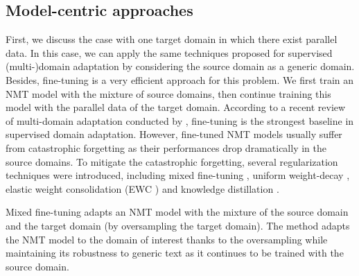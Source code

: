 \subsection{Model-centric approaches}
First, we discuss the case with one target domain in which there exist parallel data. In this case, we can apply the same techniques proposed for supervised (multi-)domain adaptation by considering the source domain as a generic domain. Besides, fine-tuning is a very efficient approach for this problem\citep{Luong15stanford,Servan16Domain,Freitag16fast,Miceli17regularization}. We first train an NMT model with the mixture of source domains, then continue training this model with the parallel data of the target domain. According to a recent review of multi-domain adaptation conducted by \citet{Pham21revisiting}, fine-tuning is the strongest baseline in supervised domain adaptation. However, fine-tuned NMT models usually suffer from catastrophic forgetting \citep{Michael89catastrophic} as their performances drop dramatically in the source domains. To mitigate the catastrophic forgetting, several regularization techniques were introduced, including mixed fine-tuning \citep{Chu17empirical}, uniform weight-decay \citep{Miceli17regularization}, elastic weight consolidation (EWC ) \citep{Kirk16overcoming,Brian19overcoming,Saunders19domain} and knowledge distillation \citep{Dakwle17fine}. 

Mixed fine-tuning \citep{Chu17empirical} adapts an NMT model with the mixture of the source domain and the target domain (by oversampling the target domain). The method adapts the NMT model to the domain of interest thanks to the oversampling while maintaining its robustness to generic text as it continues to be trained with the source domain.

